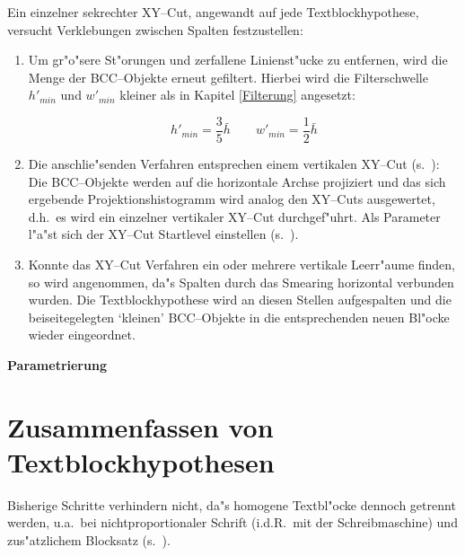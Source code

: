 Ein einzelner sekrechter XY--Cut, angewandt auf jede Textblockhypothese,
versucht Verklebungen zwischen Spalten festzustellen:
\begin{enumerate}
  \item Um gr"o"sere St"orungen und zerfallene Linienst"ucke zu entfernen, wird die Menge der
        BCC--Objekte erneut gefiltert. Hierbei wird die Filterschwelle $h'_{min}$ und $w'_{min}$
        kleiner als in Kapitel \ref{Filterung} angesetzt:

        $$h'_{min} = \frac{3}{5}\bar{h} \qquad w'_{min} = \frac{1}{2}\bar{h}$$

  \item Die anschlie"senden Verfahren entsprechen einem vertikalen XY--Cut (s.\ ):
        Die BCC--Objekte werden auf die horizontale Archse projiziert und das sich ergebende
        Projektionshistogramm wird analog den XY--Cuts ausgewertet, d.h.\ es wird ein einzelner
        vertikaler XY--Cut durchgef"uhrt. Als Parameter l"a"st sich der XY--Cut Startlevel einstellen
        (s.\ ).

  \item Konnte das XY--Cut Verfahren ein oder mehrere vertikale Leerr"aume finden, so wird
        angenommen, da"s Spalten durch das Smearing horizontal verbunden wurden.
        Die Textblockhypothese wird an diesen Stellen aufgespalten und die
        beiseitegelegten `kleinen' BCC--Objekte in die entsprechenden neuen Bl"ocke wieder eingeordnet.
\end{enumerate}

{\bf Parametrierung}


\clearpage
\section{Zusammenfassen von Textblockhypothesen}\label{Zusammenfassen}

Bisherige Schritte verhindern nicht, da"s homogene Textbl"ocke dennoch getrennt werden, u.a.\
bei nichtproportionaler Schrift (i.d.R.\ mit der Schreibmaschine) und zus"atzlichem Blocksatz (s.\
).


